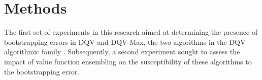 \section{Methods}\label{sec:methods}
The first set of experiments in this research aimed at determining the
presence of bootstrapping errors in DQV and DQV-Max, the two
algorithms in the DQV algorithmic family \citep{sabatelli2020deep}.
Subsequently, a second experiment sought to assess the impact of
value function ensembling on the susceptibility of these algorithms to
the bootstrapping error.

